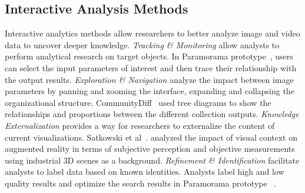 \documentclass[a4paper,fleqn]{cas-dc}
\begin{document}
\subsection{Interactive Analysis Methods}
Interactive analytics methods allow researchers to better analyze image and video data to uncover deeper knowledge. 
\textit{Tracking \& Monitoring} allow analysts to perform analytical research on target objects. 
In Paramorama prototype~\cite{Pretorius2011}, users can select the input parameters of interest and then trace their relationship with the output results.
\textit{Exploration \& Navigation} analyze the impact between image parameters by panning and zooming the interface, expanding and collapsing the organizational structure.
CommunityDiff~\cite{Datta2018} used tree diagrams to show the relationships and proportions between the different collection outputs.
\textit{Knowledge Externalization} provides a way for researchers to externalize the content of current visualizations. 
Satkowski et al~\cite{Satkowski2021}. analyzed the impact of visual context on augmented reality in terms of subjective perception and objective measurements using industrial 3D scenes as a background.
\textit{Refinement \& Identification} facilitate analysts to label data based on known identities.
Analysts label high and low quality results and optimize the search results in Paramorama prototype~\cite{Pretorius2011} .  
\end{document}
